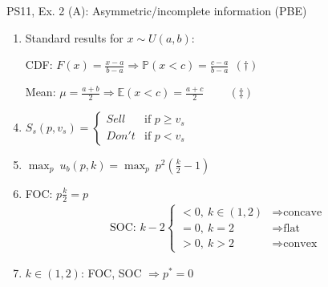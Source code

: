 \begin{frame}{PS11, Ex. 2 (A): Asymmetric/incomplete information (PBE)}
\begin{multicols}{2}
      \vfill\null\columnbreak
      \begin{enumerate}
        \item \vspace{-2pt} Standard results for $x\sim U(a, b):$
        \item[CDF:] \vspace{-2pt} $F(x)=\frac{x-a}{b-a}\Rightarrow\mathbb{P}(x<c)=\frac{c-a}{b-a}\ \ (\dagger)$
        \item[Mean:] \vspace{-2pt}  $\mu=\frac{a+b}{2}\Rightarrow\mathbb{E}(x<c)=\frac{a+c}{2}\quad\quad\ (\ddagger)$
        \item \vspace{-2pt} $S_s(p,v_s)=\left\{\begin{array}{ll}
          Sell  & \text{if }p\geq v_s \\
          Don't & \text{if }p < v_s
        \end{array}\right.$
        \item \vspace{-2pt} $\displaystyle{\max_p}\ u_b(p,k)=\displaystyle{\max_p}\ p^2\left(\frac{k}{2}-1\right)$
        \item \vspace{-2pt} FOC: $p\frac{k}{2}=p$\vspace{-6pt}
        \begin{align*}
          \text{SOC: }k-2\left\{\begin{array}{ll}
              <0,\ k\in(1,2)&\Rightarrow\text{concave}\\
              =0,\ k=2&\Rightarrow\text{flat}\\
              >0,\ k>2&\Rightarrow\text{convex}
          \end{array}\right.
        \end{align*}
        \item \vspace{-6pt} $k\in(1,2)$: FOC, SOC $\Rightarrow p^*=0$
      \end{enumerate}
      \vfill\null
    \end{multicols}
\end{frame}
